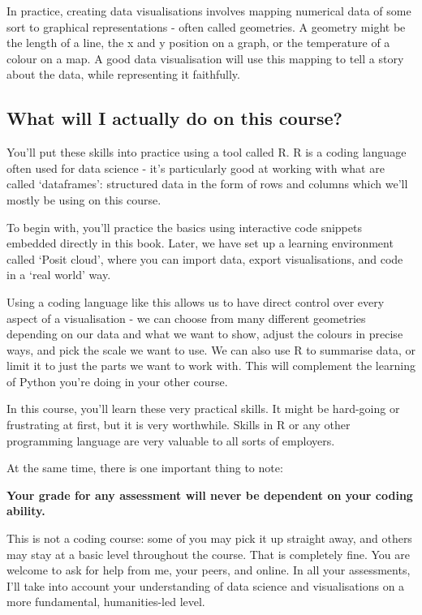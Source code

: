 \documentclass[
  letterpaper,
  DIV=11,
  numbers=noendperiod]{scrreprt}
\begin{document}

In practice, creating data visualisations involves mapping numerical
data of some sort to graphical representations - often called
geometries. A geometry might be the length of a line, the x and y
position on a graph, or the temperature of a colour on a map. A good
data visualisation will use this mapping to tell a story about the data,
while representing it faithfully.

\subsection*{What will I actually do on this
course?}\label{what-will-i-actually-do-on-this-course}

You'll put these skills into practice using a tool called R. R is a
coding language often used for data science - it's particularly good at
working with what are called `dataframes': structured data in the form
of rows and columns which we'll mostly be using on this course.

To begin with, you'll practice the basics using interactive code
snippets embedded directly in this book. Later, we have set up a
learning environment called `Posit cloud', where you can import data,
export visualisations, and code in a `real world' way.

Using a coding language like this allows us to have direct control over
every aspect of a visualisation - we can choose from many different
geometries depending on our data and what we want to show, adjust the
colours in precise ways, and pick the scale we want to use. We can also
use R to summarise data, or limit it to just the parts we want to work
with. This will complement the learning of Python you're doing in your
other course.

In this course, you'll learn these very practical skills. It might be
hard-going or frustrating at first, but it is very worthwhile. Skills in
R or any other programming language are very valuable to all sorts of
employers.

At the same time, there is one important thing to note:

\textbf{Your grade for any assessment will never be dependent on your
coding ability.}

This is not a coding course: some of you may pick it up straight away,
and others may stay at a basic level throughout the course. That is
completely fine. You are welcome to ask for help from me, your peers,
and online. In all your assessments, I'll take into account your
understanding of data science and visualisations on a more fundamental,
humanities-led level.
\end{document}
